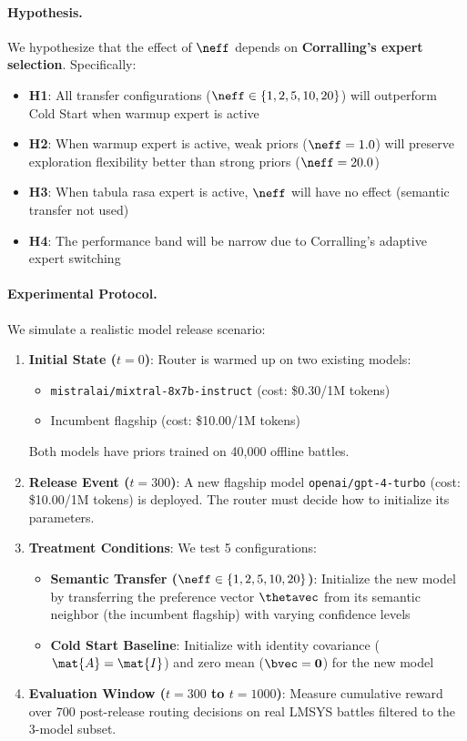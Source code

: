 \paragraph{Hypothesis.}
We hypothesize that the effect of $\neff$ depends on \textbf{Corralling's expert selection}. Specifically:
\begin{itemize}[leftmargin=*, itemsep=2pt]
    \item \textbf{H1}: All transfer configurations ($\neff \in \{1, 2, 5, 10, 20\}$) will outperform Cold Start when warmup expert is active
    \item \textbf{H2}: When warmup expert is active, weak priors ($\neff=1.0$) will preserve exploration flexibility better than strong priors ($\neff=20.0$)
    \item \textbf{H3}: When tabula rasa expert is active, $\neff$ will have no effect (semantic transfer not used)
    \item \textbf{H4}: The performance band will be narrow due to Corralling's adaptive expert switching
\end{itemize}

\paragraph{Experimental Protocol.}
We simulate a realistic model release scenario:
\begin{enumerate}[leftmargin=*, itemsep=2pt]
    \item \textbf{Initial State ($t=0$)}: Router is warmed up on two existing models:
    \begin{itemize}
        \item \texttt{mistralai/mixtral-8x7b-instruct} (cost: \$0.30/1M tokens)
        \item Incumbent flagship (cost: \$10.00/1M tokens)
    \end{itemize}
    Both models have priors trained on 40,000 offline battles.
    
    \item \textbf{Release Event ($t=300$)}: A new flagship model \texttt{openai/gpt-4-turbo} (cost: \$10.00/1M tokens) is deployed. The router must decide how to initialize its parameters.
    
    \item \textbf{Treatment Conditions}: We test 5 configurations:
    \begin{itemize}
        \item \textbf{Semantic Transfer ($\neff \in \{1, 2, 5, 10, 20\}$)}: Initialize the new model by transferring the preference vector $\thetavec$ from its semantic neighbor (the incumbent flagship) with varying confidence levels
        \item \textbf{Cold Start Baseline}: Initialize with identity covariance ($\mat{A} = \mat{I}$) and zero mean ($\bvec = \mathbf{0}$) for the new model
    \end{itemize}
    
    \item \textbf{Evaluation Window ($t=300$ to $t=1000$)}: Measure cumulative reward over 700 post-release routing decisions on real LMSYS battles filtered to the 3-model subset.
\end{enumerate}


